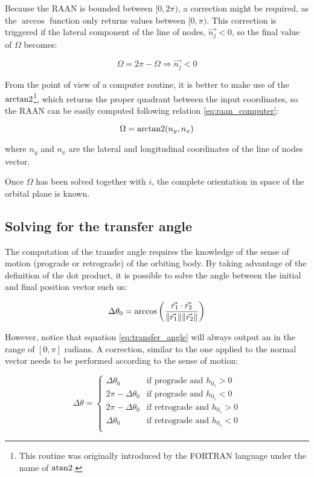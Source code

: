 Because the RAAN is bounded between $[0,2\pi)$, a correction might be required,
as the $\arccos$ function only returns values between $[0,\pi)$. This correction
is triggered if the lateral component of the line of nodes, $\vec{n_{j}} < 0$,
so the final value of $\Omega$ becomes:

\begin{equation}
  \Omega = 2\pi - \Omega \Rightarrow \vec{n_{j}} < 0
  \label{eq:raan_correction}
\end{equation}

From the point of view of a computer routine, it is better to make use of the
$\operatorname{arctan2}$\footnote{This routine was originally introduced by the FORTRAN
  language under the name of $\operatorname{atan2}$.}, which returns the proper quadrant
between the input coordinates, so the RAAN can be easily computed following
relation \ref{eq:raan_computer}:

\begin{equation}
  \Omega = \operatorname{arctan2}(n_{y}, n_{x})
  \label{eq:raan_computer}
\end{equation}

where $n_{y}$ and $n_{x}$ are the lateral and longitudinal coordinates of the
line of nodes vector.

Once $\Omega$ has been solved together with $i$, the complete orientation in
space of the orbital plane is known.

\subsection{Solving for the transfer angle}

The computation of the transfer angle requires the knowledge of the sense of
motion (prograde or retrograde) of the orbiting body. By taking advantage of the
definition of the dot product, it is possible to solve the angle between the
initial and final position vector such us:

\begin{equation}
  \Delta \theta_0 = \arccos{\left(\frac{\vec{r_1} \cdot \vec{r_2}}{\lVert\vec{r_1}\rVert \lVert\vec{r_2}\rVert}\right)}
  \label{eq:transfer_angle}
\end{equation}

However, notice that equation \ref{eq:transfer_angle} will always output an
in the range of $[0, \pi]$ radians. A correction, similar to the one applied to
the normal vector needs to be performed according to the sense of motion:


\begin{equation}
  \Delta \theta =
  \begin{cases}
	  \Delta \theta_0 & \text{if prograde and $h_{0_{z}} > 0$} \\
	  2 \pi - \Delta \theta_0 & \text{if prograde and $h_{0_{z}} < 0$} \\
	  2 \pi - \Delta \theta_0 & \text{if retrograde and $h_{0_{z}} > 0$} \\
	  \Delta \theta_0 & \text{if retrograde and $h_{0_{z}} < 0$} \\
  \end{cases}
\end{equation}



